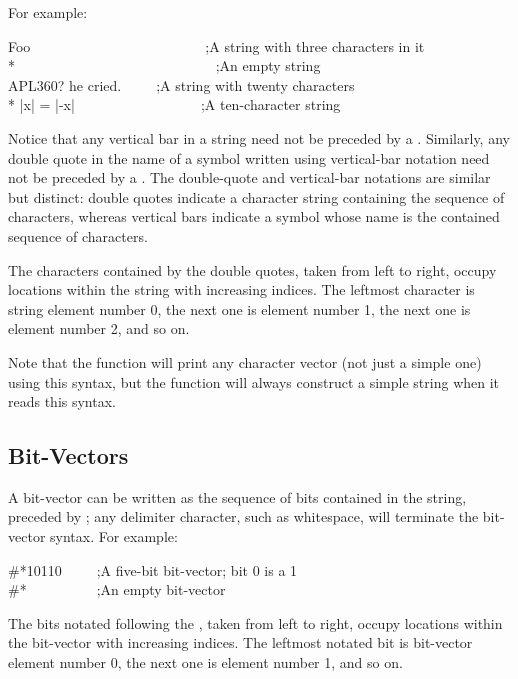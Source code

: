 For example:
\begin{lisp}
{\Xdquote}Foo{\Xdquote}~~~~~~~~~~~~~~~~~~~~~~~~~;\textrm{A string with three characters in it} \\*
{\Xdquote}{\Xdquote}~~~~~~~~~~~~~~~~~~~~~~~~~~~~;\textrm{An empty string} \\
{\Xdquote}{\Xbackslash}{\Xdquote}APL{\Xbackslash}{\Xbackslash}360?{\Xbackslash}{\Xdquote} he cried.{\Xdquote}~~~~~;\textrm{A string with twenty characters} \\*
{\Xdquote}|x| = |-x|{\Xdquote}~~~~~~~~~~~~~~~~~~;\textrm{A ten-character string}
\end{lisp}
Notice that any vertical bar \cd{|} in a string need not be
preceded by a \cd{{\Xbackslash}}.  Similarly, any double quote in the name
of a symbol written using vertical-bar notation need not be
preceded by a \cd{{\Xbackslash}}.  The double-quote and vertical-bar notations
are similar but distinct: double quotes indicate a character string
containing the sequence of characters,
whereas vertical bars indicate a symbol whose name is the contained
sequence of characters.

The characters contained by the double quotes, taken from left to right,
occupy locations within the string with increasing indices.
The leftmost character is string element number 0, the next one
is element number 1, the next one is element number 2, and so on.

Note that the function  will print any character vector
(not just a simple one)
using this syntax, but the function  will always construct
a simple string when it reads this syntax.

\subsection{Bit-Vectors}

A bit-vector can be written as the sequence of bits contained in the
string, preceded by \cd{\#*}; any delimiter character, such as whitespace,
will terminate the bit-vector syntax.
For example:
\begin{lisp}
\#*10110~~~~~;\textrm{A five-bit bit-vector; bit 0 is a 1} \\
\#*~~~~~~~~~~;\textrm{An empty bit-vector}
\end{lisp}

The bits notated following the \cd{\#*}, taken from left to right,
occupy locations within the bit-vector with increasing indices.
The leftmost notated bit is bit-vector element number 0, the next one
is element number 1, and so on.


